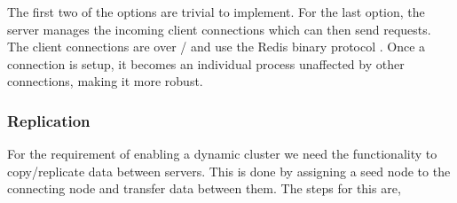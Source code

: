 The first two of the options are trivial to implement. For the last option, the
server manages the incoming client connections which can then send requests. The
client connections are over / and use the Redis binary
protocol \citep{RedisProtocol}%
. Once a connection is setup, it becomes an individual process unaffected by
other connections, making it more robust.

\subsubsection{Replication}
\label{section:analysis.design.replication}

For the requirement  of enabling a dynamic
cluster we need the functionality to copy/replicate data between servers.
This is done by assigning a seed node to the connecting node and transfer
data between them. The steps for this are,


